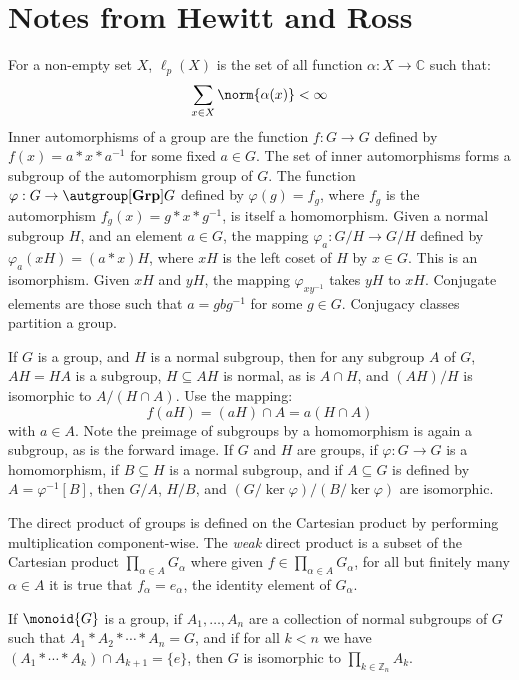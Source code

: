 \section{Notes from Hewitt and Ross}
For a non-empty set $X$, $\ell_{p}(X)$ is the set of all function
$\alpha:X\rightarrow\mathbb{C}$ such that:
\begin{equation}
    \sum_{x\in{X}}\norm{\alpha(x)}<\infty
\end{equation}
Inner automorphisms of a group are the function $f:G\rightarrow{G}$ defined by
$f(x)=a*x*a^{\minus{1}}$ for some fixed $a\in{G}$. The set of inner
automorphisms forms a subgroup of the automorphism group of $G$. The function
$\varphi:G\rightarrow\autgroup[\textbf{Grp}]{G}$ defined by
$\varphi(g)=f_{g}$, where $f_{g}$ is the automorphism
$f_{g}(x)=g*x*g^{\minus{1}}$, is itself a homomorphism. Given a normal subgroup
$H$, and an element $a\in{G}$, the mapping
$\varphi_{a}:G/H\rightarrow{G}/H$ defined by
$\varphi_{a}(xH)=(a*x)H$, where $xH$ is the left coset of $H$ by $x\in{G}$. This
is an isomorphism. Given $xH$ and $yH$, the mapping
$\varphi_{xy^{\minus{1}}}$ takes $yH$ to $xH$. Conjugate elements are those
such that $a=gbg^{\minus{1}}$ for some $g\in{G}$. Conjugacy classes partition a
group.
\par\hfill\par
If $G$ is a group, and $H$ is a normal subgroup, then for any subgroup $A$ of
$G$, $AH=HA$ is a subgroup, $H\subseteq{AH}$ is normal, as is $A\cap{H}$, and
$(AH)/H$ is isomorphic to $A/(H\cap{A})$. Use the mapping:
\begin{equation}
    f(aH)=(aH)\cap{A}=a(H\cap{A})
\end{equation}
with $a\in{A}$. Note the preimage of subgroups by a homomorphism is again a
subgroup, as is the forward image. If $G$ and $H$ are groups, if
$\varphi:G\rightarrow{G}$ is a homomorphism, if $B\subseteq{H}$ is a normal
subgroup, and if $A\subseteq{G}$ is defined by $A=\varphi^{\minus{1}}[B]$, then
$G/A$, $H/B$, and $(G/\ker{\varphi})/(B/\ker{\varphi})$ are isomorphic.
\par\hfill\par
The direct product of groups is defined on the Cartesian product by performing
multiplication component-wise. The \textit{weak} direct product is a subset of
the Cartesian product $\prod_{\alpha\in{A}}G_{\alpha}$ where given
$f\in\prod_{\alpha\in{A}}G_{\alpha}$, for all but finitely many $\alpha\in{A}$
it is true that $f_{\alpha}=e_{\alpha}$, the identity element of $G_{\alpha}$.
\begin{theorem}
    If $\monoid{G}$ is a group, if $A_{1},\dots,A_{n}$ are a collection of
    normal subgroups of $G$ such that $A_{1}*A_{2}*\cdots*A_{n}=G$, and if for
    all $k<n$ we have $(A_{1}*\cdots*A_{k})\cap{A}_{k+1}=\{e\}$, then $G$ is
    isomorphic to $\prod_{k\in\mathbb{Z}_{n}}A_{k}$.
\end{theorem}
